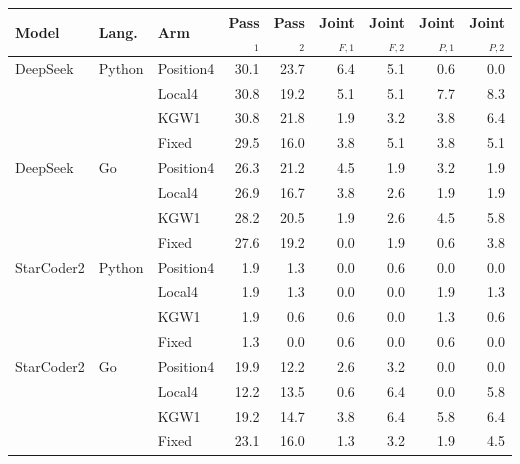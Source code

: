 \begin{tabular}{lllrrrrrr}
\toprule
Model & Lang. & Arm & Pass$_1$ & Pass$_2$ & Joint$_{F,1}$ & Joint$_{F,2}$ & Joint$_{P,1}$ & Joint$_{P,2}$ \\
\midrule
DeepSeek & Python & Position4 & 30.1 & 23.7 & 6.4 & 5.1 & 0.6 & 0.0 \\
 &  & Local4 & 30.8 & 19.2 & 5.1 & 5.1 & 7.7 & 8.3 \\
 &  & KGW1 & 30.8 & 21.8 & 1.9 & 3.2 & 3.8 & 6.4 \\
 &  & Fixed & 29.5 & 16.0 & 3.8 & 5.1 & 3.8 & 5.1 \\
DeepSeek & Go & Position4 & 26.3 & 21.2 & 4.5 & 1.9 & 3.2 & 1.9 \\
 &  & Local4 & 26.9 & 16.7 & 3.8 & 2.6 & 1.9 & 1.9 \\
 &  & KGW1 & 28.2 & 20.5 & 1.9 & 2.6 & 4.5 & 5.8 \\
 &  & Fixed & 27.6 & 19.2 & 0.0 & 1.9 & 0.6 & 3.8 \\
StarCoder2 & Python & Position4 & 1.9 & 1.3 & 0.0 & 0.6 & 0.0 & 0.0 \\
 &  & Local4 & 1.9 & 1.3 & 0.0 & 0.0 & 1.9 & 1.3 \\
 &  & KGW1 & 1.9 & 0.6 & 0.6 & 0.0 & 1.3 & 0.6 \\
 &  & Fixed & 1.3 & 0.0 & 0.6 & 0.0 & 0.6 & 0.0 \\
StarCoder2 & Go & Position4 & 19.9 & 12.2 & 2.6 & 3.2 & 0.0 & 0.0 \\
 &  & Local4 & 12.2 & 13.5 & 0.6 & 6.4 & 0.0 & 5.8 \\
 &  & KGW1 & 19.2 & 14.7 & 3.8 & 6.4 & 5.8 & 6.4 \\
 &  & Fixed & 23.1 & 16.0 & 1.3 & 3.2 & 1.9 & 4.5 \\
\bottomrule
\end{tabular}
